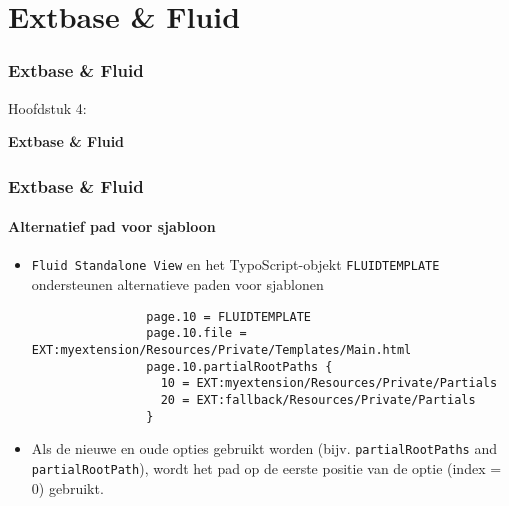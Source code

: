 %

\section{Extbase \& Fluid}
\begin{frame}[fragile]
	\frametitle{Extbase \& Fluid}

	\begin{center}\huge{Hoofdstuk 4:}\end{center}
	\begin{center}\huge{\color{typo3darkgrey}\textbf{Extbase \& Fluid}}\end{center}

\end{frame}


\begin{frame}[fragile]
	\frametitle{Extbase \& Fluid}
	\framesubtitle{Alternatief pad voor sjabloon}

	\lstset{
		basicstyle=\tiny\ttfamily
	}

	\begin{itemize}
		\item \texttt{Fluid Standalone View} en het TypoScript-objekt \texttt{FLUIDTEMPLATE} ondersteunen alternatieve paden voor sjablonen

			\begin{lstlisting}
				page.10 = FLUIDTEMPLATE
				page.10.file = EXT:myextension/Resources/Private/Templates/Main.html
				page.10.partialRootPaths {
				  10 = EXT:myextension/Resources/Private/Partials
				  20 = EXT:fallback/Resources/Private/Partials
				}
			\end{lstlisting}

		\item Als de nieuwe en oude opties gebruikt worden (bijv. \texttt{partialRootPaths} and \texttt{partialRootPath}),
			wordt het pad op de eerste positie van de optie (index = 0) gebruikt.

	\end{itemize}

\end{frame}

